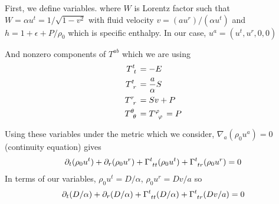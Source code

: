 \documentclass[prd]{revtex4}
\begin{document}
\iffalse
First, we define variables. 
where $W$ is Lorentz factor such that $W = \alpha u^t=1/\sqrt{1-v^2}$ with fluid velocity $v =(a u^r) / (\alpha u^t)$ and $h=1+\epsilon+P/\rho_0$ which is specific enthalpy. In our case, $u^a = (u^t, u^r, 0, 0)$

And nonzero components of $T^{ab}$ which we are using
\begin{align}
T\indices{^t_t} &= -E \\
T\indices{^t_r} &= \frac{a}{\alpha} S \\
T\indices{^r_r} &=Sv+P\\
T\indices{^\theta_\theta}&=T\indices{^\varphi_\varphi}=P
\end{align}

Using these variables under the metric which we consider, $\nabla_a (\rho_0 u^a)=0$ (continuity equation) gives
\begin{align}
\partial_t (\rho_0 u^t) + \partial_r (\rho_0 u^r) + \Gamma\indices{^t_{tt}}(\rho_0 u^t) + \Gamma\indices{^t_{tr}}(\rho_0 u^r) = 0
\end{align} 
In terms of our variables, $\rho_0 u^t = D/\alpha$, $\rho_0 u^r = D v /a$ so
\begin{align}
\partial_t (D/\alpha) + \partial_r (D/\alpha) + \Gamma\indices{^t_{tt}}(D/\alpha) + \Gamma\indices{^t_{tr}}(D v / a) = 0
\end{align} 
\end{document}
